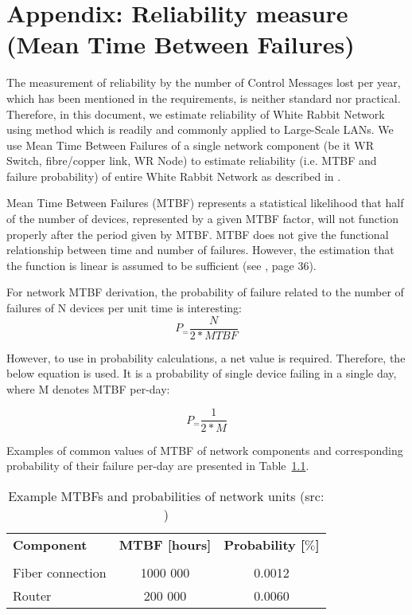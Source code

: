 \chapter{Appendix: Reliability measure (Mean Time Between Failures)}
\label{appA}



The measurement of reliability by the number of Control Messages lost per year, 
which has been mentioned in the requirements, is neither standard nor practical.
Therefore, in this document, we estimate reliability of White Rabbit Network 
using method which is readily and commonly applied to Large-Scale LANs. We use 
Mean Time Between Failures of a single network component (be it WR Switch, 
fibre/copper link, WR Node) to estimate reliability (i.e. MTBF and failure
probability) of entire White Rabbit Network as described in
\cite{DesigningLSLANs}. 

Mean Time Between Failures (MTBF) represents a statistical likelihood that half 
of the number of devices, represented by a given MTBF factor, will not function 
properly after the period given by MTBF. MTBF does not give the functional 
relationship between time and number of failures. However, the estimation that 
the function is linear is assumed to be sufficient (see \cite{DesigningLSLANs}, 
page 36).

For network MTBF derivation, the probability of failure related to the number of
failures of N devices per unit time is interesting:
  \begin{equation}
     \label{eq:MTBFprob}
	P_= \frac{N}{2*MTBF}  
  \end{equation}

However, to use in probability calculations, a net value is required.
Therefore, the below equation is used. It is a probability of single device
failing in a single day, where M denotes MTBF 
per-day:

  \begin{equation}
      \label{eq:MTBFprobNetto}
	P_= \frac{1 }{2*M}  
  \end{equation}

Examples of common values of MTBF of network components and corresponding 
probability of their failure per-day are presented in 
Table~\ref{tab:MTBFtable}.


\begin{table}[ht]
\caption{Example MTBFs and probabilities of network units (src: 
	\cite{DesigningLSLANs})} 
\centering
	\begin{tabular}{| l |  c | c |}          \hline
\textbf{Component} & \textbf{MTBF [hours]} & \textbf{Probability [$\%$]}\\ 
                   &                       &                           \\ \hline
Fiber connection   &       1000 000         & 0.0012                    \\
\hline
Router             &       200 000         & 0.0060                    \\ \hline
\end{tabular}
\label{tab:MTBFtable}
\end{table}

